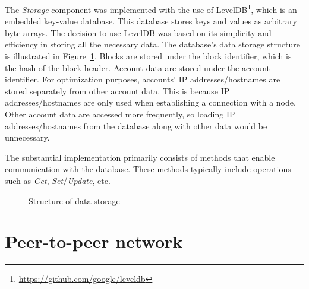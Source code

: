 The \emph{Storage} component was implemented with the use of LevelDB\footnote{\url{https://github.com/google/leveldb}}, which is an embedded key-value database. This database stores keys and values as arbitrary byte arrays. The decision to use LevelDB was based on its simplicity and efficiency in storing all the necessary data. The database's data storage structure is illustrated in Figure~\ref{figure:my.storage.structure}. Blocks are stored under the block identifier, which is the hash of the block header. Account data are stored under the account identifier. For optimization purposes, accounts' IP addresses/hostnames are stored separately from other account data. This is because IP addresses/hostnames are only used when establishing a connection with a node. Other account data are accessed more frequently, so loading IP addresses/hostnames from the database along with other data would be unnecessary.

The substantial implementation primarily consists of methods that enable communication with the database. These methods typically include operations such as \emph{Get}, \emph{Set}/\emph{Update}, etc.

\begin{figure}[h]
    \begin{center}
    \end{center}
    \caption{Structure of data storage}
    \label{figure:my.storage.structure}
\end{figure}



\section{Peer-to-peer network}

